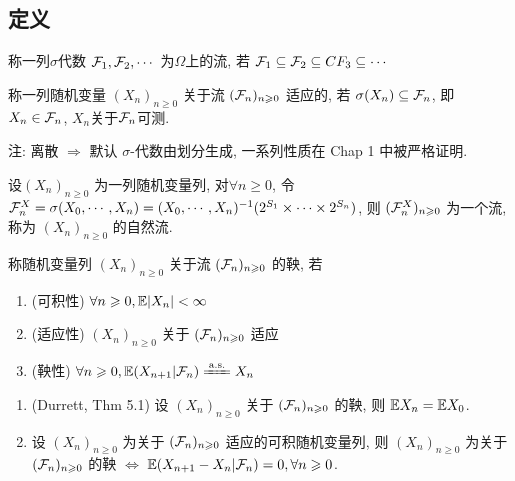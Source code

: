 \subsection{定义}

\begin{definition}[流]
    称一列$\sigma$代数 $\mathcal{F}_1,\mathcal{F}_2,\cdots$ 为$\Omega$上的流, 若 $\mathcal{F}_1\subseteq \mathcal{F}_2\subseteq CF_3\subseteq\cdots$
\end{definition}

\begin{definition}[适应过程]
    称一列随机变量 $(X_n)_{n\geq 0}$ 关于流 $(\mathcal{F}_n)_{n\geqslant 0}$ 适应的, 若 $\sigma(X_n)\subseteq \mathcal{F}_n$, 即 $X_n\in \mathcal{F}_n$, $X_n$关于$\mathcal{F}_n$可测.
\end{definition}
注: 离散 $\Rightarrow$ 默认 $\sigma$-代数由划分生成, 一系列性质在 Chap 1 中被严格证明.

\begin{example}
    设$(X_n)_{n\geq 0}$ 为一列随机变量列, 对$\forall n\geq 0$, 令 $\mathcal{F}_n^X=\sigma(X_0,\cdots,X_n)=(X_0,\cdots,X_n)^{-1}(2^{S_1}\times\cdots\times 2^{S_n})$, 则 $(\mathcal{F}_n^X)_{n\geqslant 0}$ 为一个流, 称为 $(X_n)_{n\geq 0}$ 的自然流.
\end{example}

\begin{definition}[离散鞅]\label{def:p140-def3}
    称随机变量列 $(X_n)_{n\geq 0}$ 关于流 $(\mathcal{F}_n)_{n\geqslant 0}$ 的鞅, 若
    \begin{enumerate}
        \item (可积性) $\forall n\geqslant 0, \mathbb E|X_n|<\infty$
        \item (适应性) $(X_n)_{n\geq 0}$ 关于 $(\mathcal{F}_n)_{n\geqslant 0}$ 适应
        \item (鞅性) $\forall n\geq 0, \EE(X_{n+1}|\CF_n)\xlongequal{\text{a.s.}}X_n$
    \end{enumerate}
\end{definition}

\begin{theorem}
    \begin{enumerate}
        \item (Durrett, Thm 5.1) 设 $(X_n)_{n\geq 0}$ 关于 $(\mathcal{F}_n)_{n\geqslant 0}$ 的鞅, 则 $\mathbb E X_n=\mathbb E X_0$.
        \item 设 $(X_n)_{n\geq 0}$ 为关于 $(\mathcal{F}_n)_{n\geqslant 0}$ 适应的可积随机变量列, 则 $(X_n)_{n\geq 0}$ 为关于 $(\mathcal{F}_n)_{n\geqslant 0}$ 的鞅 $\iff$ $\mathbb E(X_{n+1}-X_n|\mathcal{F}_n)=0,\forall n\geqslant 0$.
    \end{enumerate}
\end{theorem}

